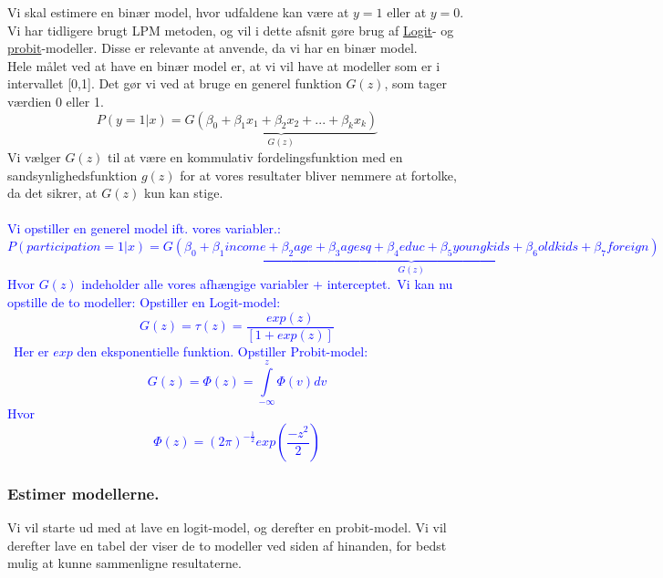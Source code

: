 \documentclass[
  10pt,
]{article}
\begin{document}
Vi skal estimere en binær model, hvor udfaldene kan være at \(y = 1\)
eller at \(y = 0\). Vi har tidligere brugt LPM metoden, og vil i dette
afsnit gøre brug af \hyperref[sec:logit]{Logit}- og
\hyperref[sec:probit]{probit}-modeller. Disse er relevante at anvende,
da vi har en binær model.\\
Hele målet ved at have en binær model er, at vi vil have at modeller som
er i intervallet {[}0,1{]}. Det gør vi ved at bruge en generel funktion
\(G(z)\), som tager værdien 0 eller 1.
\[P(y=1|x)=\underbrace{G(\beta_0+\beta_1x_1+\beta_2x_2+...+\beta_kx_k)}_{G(z)} \]
Vi vælger \(G(z)\) til at være en kommulativ fordelingsfunktion med en
sandsynlighedsfunktion \(g(z)\) for at vores resultater bliver nemmere
at fortolke, da det sikrer, at \(G(z)\) kun kan stige.\\
~\\
\textcolor{blue}{Vi opstiller en generel model ift. vores variabler.:\
\[P(participation=1|x)=\underbrace{G(\beta_0+\beta_1income+\beta_2age+\beta_3agesq+\beta_4educ+\beta_5youngkids+\beta_6oldkids+\beta_7foreign)}_{G(z)}  \]
Hvor $G(z)$ indeholder alle vores afhængige variabler + interceptet.\
Vi kan nu opstille de to modeller:
\newline
Opstiller en Logit-model:\
\[ G(z)=\tau(z)=\frac{exp(z)}{[1+exp(z)]}\]\
Her er $exp$ den eksponentielle funktion.
\newline
Opstiller Probit-model:
\[ G(z)=\Phi(z)=\int\limits_{-\infty}^z\Phi(v)dv \]
Hvor
\[ \Phi(z)=(2\pi)^{-\frac{1}{2}} exp(\frac{-z^2}{2}) \] } \newpage

\hypertarget{estimer-modellerne.}{%
\subsubsection{Estimer modellerne.}\label{estimer-modellerne.}}

Vi vil starte ud med at lave en logit-model, og derefter en
probit-model. Vi vil derefter lave en tabel der viser de to modeller ved
siden af hinanden, for bedst mulig at kunne sammenligne resultaterne.
\end{document}
